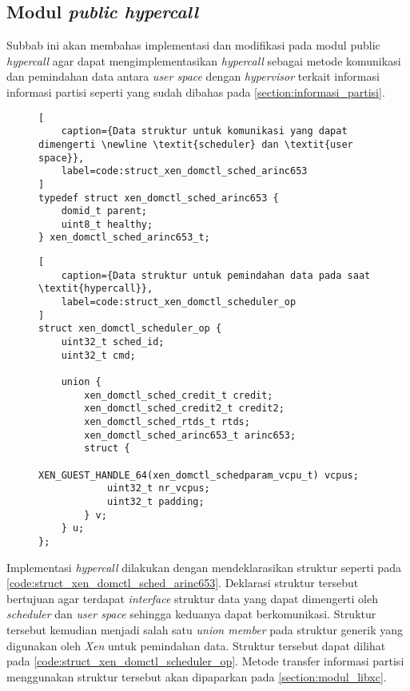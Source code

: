 \subsection{Modul \textit{public hypercall}}
\label{section:modul_public_hypercall}

Subbab ini akan membahas implementasi dan modifikasi pada modul public \textit{hypercall} agar
dapat mengimplementasikan \textit{hypercall} sebagai metode komunikasi dan pemindahan data
antara \textit{user space} dengan \textit{hypervisor} terkait informasi informasi partisi
seperti yang sudah dibahas pada \autoref{section:informasi_partisi}.

\begin{figure}
\begin{lstlisting}[
	caption={Data struktur untuk komunikasi yang dapat dimengerti \newline \textit{scheduler} dan \textit{user space}},
	label=code:struct_xen_domctl_sched_arinc653
]
typedef struct xen_domctl_sched_arinc653 {
    domid_t parent;
    uint8_t healthy;
} xen_domctl_sched_arinc653_t;
\end{lstlisting}
\end{figure}

\begin{figure}
\begin{lstlisting}[
	caption={Data struktur untuk pemindahan data pada saat \textit{hypercall}},
	label=code:struct_xen_domctl_scheduler_op
]
struct xen_domctl_scheduler_op {
    uint32_t sched_id;
    uint32_t cmd;

    union {
        xen_domctl_sched_credit_t credit;
        xen_domctl_sched_credit2_t credit2;
        xen_domctl_sched_rtds_t rtds;
        xen_domctl_sched_arinc653_t arinc653;
        struct {
            XEN_GUEST_HANDLE_64(xen_domctl_schedparam_vcpu_t) vcpus;
            uint32_t nr_vcpus;
            uint32_t padding;
        } v;
    } u;
};
\end{lstlisting}
\end{figure}

Implementasi \textit{hypercall} dilakukan dengan mendeklarasikan struktur seperti pada
\autoref{code:struct_xen_domctl_sched_arinc653}. Deklarasi struktur tersebut bertujuan agar
terdapat \textit{interface} struktur data yang dapat dimengerti oleh \textit{scheduler} dan
\textit{user space} sehingga keduanya dapat berkomunikasi. Struktur tersebut kemudian menjadi
salah satu \textit{union member} pada struktur generik yang digunakan oleh \textit{Xen} untuk
pemindahan data. Struktur tersebut dapat dilihat pada
\autoref{code:struct_xen_domctl_scheduler_op}. Metode transfer informasi partisi menggunakan
struktur tersebut akan dipaparkan pada \autoref{section:modul_libxc}.

